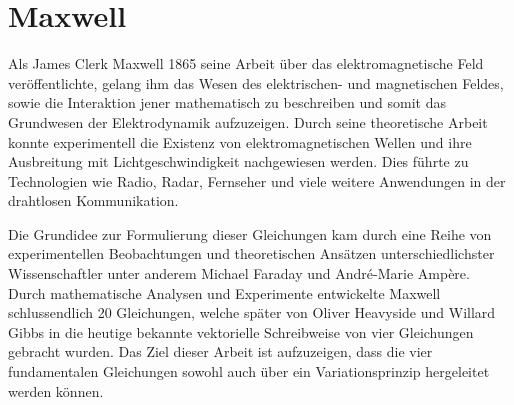 %
%
%
%

\chapter{Maxwell\label{chapter:maxwell}}
\begin{refsection}

Als James Clerk Maxwell 1865 seine Arbeit über das elektromagnetische Feld veröffentlichte, gelang ihm das Wesen des elektrischen- und magnetischen Feldes, sowie die Interaktion jener mathematisch zu beschreiben und somit das Grundwesen der Elektrodynamik aufzuzeigen.
Durch seine theoretische Arbeit konnte experimentell die Existenz von elektromagnetischen Wellen und ihre Ausbreitung mit Lichtgeschwindigkeit nachgewiesen werden.
Dies führte zu Technologien wie Radio, Radar, Fernseher und viele weitere Anwendungen in der drahtlosen Kommunikation.

Die Grundidee zur Formulierung dieser Gleichungen kam durch eine Reihe von experimentellen Beobachtungen und theoretischen Ansätzen unterschiedlichster Wissenschaftler unter anderem Michael Faraday und André-Marie Ampère.
Durch mathematische Analysen und Experimente entwickelte Maxwell schlussendlich 20 Gleichungen, welche später von Oliver Heavyside und Willard Gibbs in die heutige bekannte vektorielle Schreibweise von vier Gleichungen gebracht wurden.
Das Ziel dieser Arbeit ist aufzuzeigen, dass die vier fundamentalen Gleichungen sowohl auch über ein Variationsprinzip hergeleitet werden können.





%
%
%
%


\printbibliography[heading=subbibliography]
\end{refsection}
